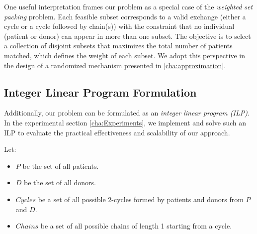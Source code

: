 \label{pro:weighted_set_packing}

One useful interpretation frames our problem as a special case of the \emph{weighted set packing} problem. Each feasible subset corresponds to a valid exchange (either a cycle or a cycle followed by chain(s)) with the constraint that no individual (patient or donor) can appear in more than one subset. The objective is to select a collection of disjoint subsets that maximizes the total number of patients matched, which defines the weight of each subset. We adopt this perspective in the design of a randomized mechanism presented in \autoref{cha:approximation}.




\subsection{Integer Linear Program Formulation}
\label{sec:Integer Linear Program Formulation}
Additionally, our problem can be formulated as an \emph{integer linear program (ILP)}. In the experimental section \autoref{cha:Experiments}, we implement and solve such an ILP to evaluate the practical effectiveness and scalability of our approach.


Let:
\begin{itemize}
    \item $P$ be the set of all patients.
    \item $D$ be the set of all donors.
    \item $Cycles$ be a set of all possible 2-cycles formed by patients and donors from $P$ and $D$.
    \item $Chains$ be a set of all possible chains of length 1 starting from a cycle.
\end{itemize}

